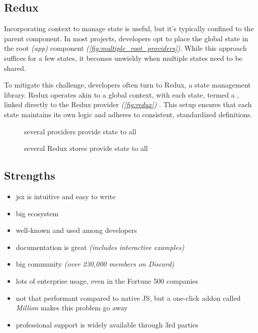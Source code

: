 \subsection{Redux}
\label{subsec:redux}

Incorporating context to manage state is useful, but it's typically confined to the parent component. In most projects, developers opt to place the global state in the root \textit{(app)} component \textit{(\autoref{fig:multiple_root_providers})}. While this approach suffices for a few states, it becomes unwieldy when multiple states need to be shared.

To mitigate this challenge, developers often turn to Redux, a state management library. Redux operates akin to a global context, with each state, termed a , linked directly to the Redux provider \textit{(\autoref{fig:redux})} \cite{redux:overview}. This setup ensures that each state maintains its own logic and adheres to consistent, standardized definitions.

\begin{figure}[ht]
    \centering
    \begin{minipage}[t]{0.3\textwidth}
        \centering
        
        \caption{several providers provide state to all}
        \label{fig:multiple_root_providers}
    \end{minipage}
    \hfill
    \begin{minipage}[t]{0.6\textwidth}
        \centering
        
        \caption{several Redux stores provide state to all}
        \label{fig:redux}
    \end{minipage}
\end{figure}

\subsection{Strengths}
\label{subsec:react:strengths}
\begin{itemize}
    \item \acrshort{jsx} is intuitive and easy to write
    \item big ecosystem
    \item well-known and used among developers
    \item documentation is great \textit{(includes interactive examples)}
    \item big community \textit{(over 230,000 members on Discord)}
    \item lots of enterprise usage, even in the Fortune 500 companies \cite{buildin:react_companies}
    \item not that performant compared to native JS, but a one-click addon called \textsl{Million} \cite{million} makes this problem go away
    \item professional support is widely available through 3rd parties
\end{itemize}


